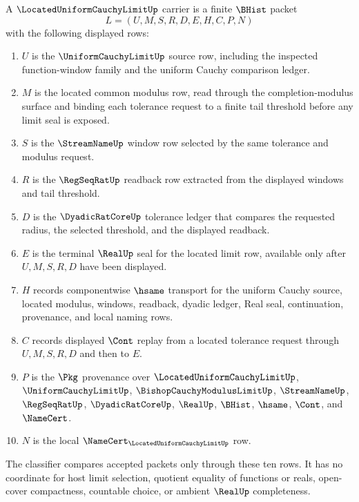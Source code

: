 \begin{definition}
\label{def:located-uniform-cauchy-limit-carrier}
A $\LocatedUniformCauchyLimitUp$ carrier is a finite $\BHist$ packet
$$
L=(U,M,S,R,D,E,H,C,P,N)
$$
with the following displayed rows:
\begin{enumerate}
\item $U$ is the $\UniformCauchyLimitUp$ source row, including the inspected function-window family and the uniform Cauchy comparison ledger.
\item $M$ is the located common modulus row, read through the completion-modulus surface and binding each tolerance request to a finite tail threshold before any limit seal is exposed.
\item $S$ is the $\StreamNameUp$ window row selected by the same tolerance and modulus request.
\item $R$ is the $\RegSeqRatUp$ readback row extracted from the displayed windows and tail threshold.
\item $D$ is the $\DyadicRatCoreUp$ tolerance ledger that compares the requested radius, the selected threshold, and the displayed readback.
\item $E$ is the terminal $\RealUp$ seal for the located limit row, available only after $U,M,S,R,D$ have been displayed.
\item $H$ records componentwise $\hsame$ transport for the uniform Cauchy source, located modulus, windows, readback, dyadic ledger, Real seal, continuation, provenance, and local naming rows.
\item $C$ records displayed $\Cont$ replay from a located tolerance request through $U,M,S,R,D$ and then to $E$.
\item $P$ is the $\Pkg$ provenance over $\LocatedUniformCauchyLimitUp$, $\UniformCauchyLimitUp$, $\BishopCauchyModulusLimitUp$, $\StreamNameUp$, $\RegSeqRatUp$, $\DyadicRatCoreUp$, $\RealUp$, $\BHist$, $\hsame$, $\Cont$, and $\NameCert$.
\item $N$ is the local $\NameCert_{\LocatedUniformCauchyLimitUp}$ row.
\end{enumerate}
The classifier compares accepted packets only through these ten rows. It has no coordinate for host limit selection, quotient equality of functions or reals, open-cover compactness, countable choice, or ambient $\RealUp$ completeness.
\end{definition}

